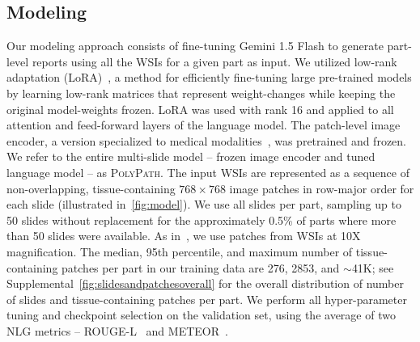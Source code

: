 \documentclass[11pt]{article}
\newcommand{\ourmodel}{\textsc{PolyPath}\xspace}
\begin{document}
\subsection{Modeling}
\label{sec:modeling}
Our modeling approach consists of fine-tuning Gemini 1.5 Flash to generate part-level reports using all the WSIs for a given part as input. We utilized low-rank adaptation (LoRA)~\citep{hu2021lora}, a method for efficiently fine-tuning large pre-trained models by learning low-rank matrices that represent weight-changes while keeping the original model-weights frozen. LoRA was used with rank 16 and applied to all attention and feed-forward layers of the language model. The patch-level image encoder, a version specialized to medical modalities~\citep{yang2024advancing}, was pretrained and frozen. We refer to the entire multi-slide model -- frozen image encoder and tuned language model -- as \ourmodel. The input WSIs are represented as a sequence of non-overlapping, tissue-containing $768 \times 768$ image patches in row-major order for each slide (illustrated in~\autoref{fig:model}). We use all slides per part, sampling up to 50 slides without replacement for the approximately 0.5\% of parts where more than 50 slides were available. As in~\citet{ahmed2024pathalign}, we use patches from WSIs at 10X magnification. The median, 95th percentile, and maximum number of tissue-containing patches per part in our training data are 276, 2853, and $\sim$41K; see Supplemental~\autoref{fig:slidesandpatchesoverall} for the overall distribution of number of slides and tissue-containing patches per part. We perform all hyper-parameter tuning and checkpoint selection on the validation set, using the average of two NLG metrics -- ROUGE-L~\citep{lin2004rouge} and METEOR~\citep{banerjee2005meteor}. \\ \\
\end{document}
